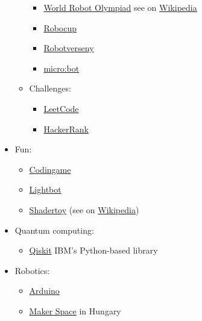 \documentclass{article}
\begin{document}
\begin{itemize}
\begin{itemize}
\begin{itemize}
            \item \href{https://wro-association.org/}{World Robot Olympiad} see on \href{https://en.wikipedia.org/wiki/World_Robot_Olympiad}{Wikipedia}
            \item \href{https://www.robocup.org/}{Robocup}
            \item \href{https://robotprog.hu/}{Robotverseny}
            \item \href{https://www.microbot.hu/}{micro:bot}
        \end{itemize}
        \item Challenges:
        \begin{itemize}
            \item \href{https://leetcode.com/}{LeetCode}
            \item \href{https://www.hackerrank.com/}{HackerRank}
        \end{itemize}
    \end{itemize}
    
   \item Fun:
   \begin{itemize}
        \item \href{https://www.codingame.com/}{Codingame}
        \item \href{https://lightbot.com/}{Lightbot}
        \item \href{https://www.shadertoy.com/browse}{Shadertoy} (see on \href{https://en.wikipedia.org/wiki/Shadertoy}{Wikipedia})
   \end{itemize}
   \item Quantum computing:
   \begin{itemize}
       \item \href{https://qiskit.org/}{Qiskit} IBM’s Python-based library
   \end{itemize}

    \item Robotics:
    \begin{itemize}
        \item \href{https://www.arduino.cc/}{Arduino}
        \item \href{https://www.makerspace.hu/}{Maker Space} in Hungary
    \end{itemize}
    

\end{itemize}
\end{document}
